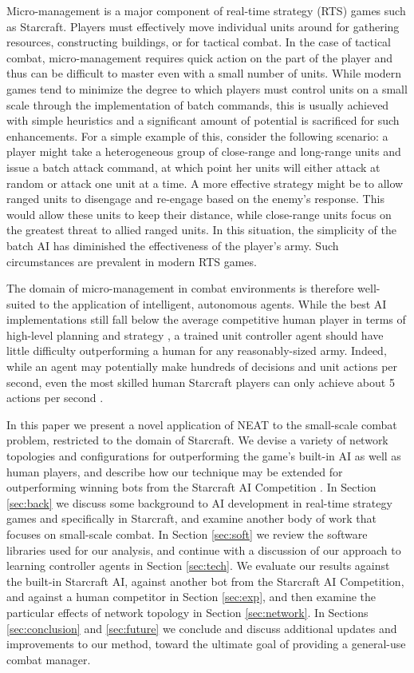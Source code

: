 \documentclass[10pt,a4paper,twocolumn]{article}
\begin{document}
Micro-management is a major component of real-time strategy (RTS) games such as Starcraft. Players must effectively move individual units around for gathering resources, constructing buildings, or for tactical combat. In the case of tactical combat, micro-management requires quick action on the part of the player and thus can be difficult to master even with a small number of units. While modern games tend to minimize the degree to which players must control units on a small scale through the implementation of batch commands, this is usually achieved with simple heuristics and a significant amount of potential is sacrificed for such enhancements. For a simple example of this, consider the following scenario: a player might take a heterogeneous group of close-range and long-range units and issue a batch attack command, at which point her units will either attack at random or attack one unit at a time. A more effective strategy might be to allow ranged units to disengage and re-engage based on the enemy's response. This would allow these units to keep their distance, while close-range units focus on the greatest threat to allied ranged units. In this situation, the simplicity of the batch AI has diminished the effectiveness of the player's army. Such circumstances are prevalent in modern RTS games.

The domain of micro-management in combat environments is therefore well-suited to the application of intelligent, autonomous agents. While the best AI implementations still fall below the average competitive human player in terms of high-level planning and strategy \cite{weber2011building}, a trained unit controller agent should have little difficulty outperforming a human for any reasonably-sized army. Indeed, while an agent may potentially make hundreds of decisions and unit actions per second, even the most skilled human Starcraft players can only achieve about 5 actions per second \cite{mccoy2008integrated}.

In this paper we present a novel application of NEAT to the small-scale combat problem, restricted to the domain of Starcraft. We devise a variety of network topologies and configurations for outperforming the game's built-in AI as well as human players, and describe how our technique may be extended for outperforming winning bots from the Starcraft AI Competition \cite{ai_competition}. In Section \ref{sec:back} we discuss some background to AI development in real-time strategy games and specifically in Starcraft, and examine another body of work that focuses on small-scale combat. In Section \ref{sec:soft} we review the software libraries used for our analysis, and continue with a discussion of our approach to learning controller agents in Section \ref{sec:tech}. We evaluate our results against the built-in Starcraft AI, against another bot from the Starcraft AI Competition, and against a human competitor in Section \ref{sec:exp}, and then examine the particular effects of network topology in Section \ref{sec:network}. In Sections \ref{sec:conclusion} and \ref{sec:future} we conclude and discuss additional updates and improvements to our method, toward the ultimate goal of providing a general-use combat manager.
\end{document}
